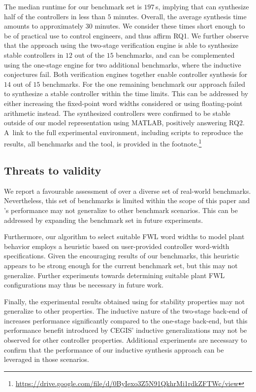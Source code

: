 \documentclass[final]{sig-alternate-05-2015}
\begin{document}
The median runtime for our benchmark set is $197$\,s, implying that \tool
can synthesize half of the controllers in less than $5$ minutes.  Overall,
the average synthesis time amounts to approximately $30$ minutes.  We
consider these times short enough to be of practical use to control
engineers, and thus affirm RQ1.  We further observe that the approach using
the two-stage verification engine is able to synthesize stable controllers
in $12$ out of the $15$ benchmarks, and can be complemented using the
one-stage engine for two additional benchmarks, where the inductive
conjectures fail.  Both verification engines together enable controller
synthesis for $14$ out of $15$ benchmarks.  For the one remaining benchmark
our approach failed to synthesize a stable controller within the time
limits.  This can be addressed by either increasing the fixed-point word
widths considered or using floating-point arithmetic instead.  The
synthesized controllers were confirmed to be stable outside of our model
representation using MATLAB, positively answering RQ2.  A~link to the full
experimental environment, including scripts to reproduce the results, all
benchmarks and the \tool tool, is provided in the
footnote.\footnote{\url{https://drive.google.com/file/d/0ByIexo3Z5N91QkhrMi1rdkZFTWc/view}}

\subsection{Threats to validity}

We report a favourable assessment of \tool over a diverse set of real-world
benchmarks. Nevertheless, this set of benchmarks is limited within the
scope of this paper and \tool's performance may not generalize to other
benchmark scenarios. This can be addressed by expanding the benchmark set
in future experiments.

Furthermore, our algorithm to select suitable FWL word widths to model
plant behavior employs a heuristic based on user-provided controller
word-width specifications.  Given the encouraging results of our benchmarks,
this heuristic appears to be strong enough for the current benchmark set,
but this may not generalize.  Further experiments towards determining
suitable plant FWL configurations may thus be necessary in future work.

Finally, the experimental results obtained using \tool for stability
properties may not generalize to other properties.  The inductive nature of
the two-stage back-end of \tool increases performance significantly compared
to the one-stage back-end, but this performance benefit introduced by CEGIS'
inductive generalizations may not be observed for other controller
properties.  Additional experiments are necessary to confirm that the
performance of our inductive synthesis approach can be leveraged in those
scenarios.
\end{document}
